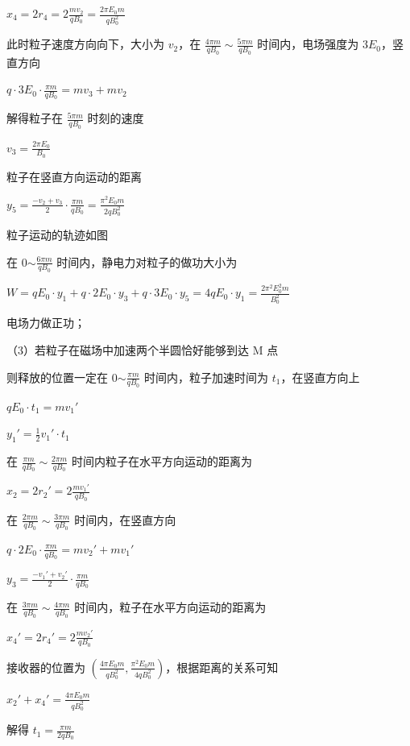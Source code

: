 \documentclass[\gkver]{gaokaozhenti}
\begin{document}
\begin{enumerate}
{$x_{4}=2r_{4}=2\frac{mv_{2}}{qB_{0}}=\frac{2\pi E_{0}m}{qB_{0}^{2}}$

此时粒子速度方向向下，大小为 $v_{2}$，在 $\frac{4\pi m}{qB_{0}}\sim\frac{5\pi m}{qB_{0}}$ 时间内，电场强度为 $3E_{0}$，竖直方向

$q\cdot 3E_{0}\cdot\frac{\pi m}{qB_{0}}=mv_{3}+mv_{2}$

解得粒子在 $\frac{5\pi m}{qB_{0}}$ 时刻的速度

$v_{3}=\frac{2\pi E_{0}}{B_{0}}$

粒子在竖直方向运动的距离

$y_{5}=\frac{-v_{2}+v_{3}}{2}\cdot\frac{\pi m}{qB_{0}}=\frac{\pi^{2}E_{0}m}{2qB_{0}^{2}}$

粒子运动的轨迹如图


在 0$\sim\frac{6\pi m}{qB_{0}}$ 时间内，静电力对粒子的做功大小为

$W=qE_{0}\cdot y_{1}+q\cdot 2E_{0}\cdot y_{3}+q\cdot 3E_{0}\cdot y_{5}=4qE_{0}\cdot y_{1}=\frac{2\pi^{2}E_{0}^{2}m}{B_{0}^{2}}$

电场力做正功；

（3）若粒子在磁场中加速两个半圆恰好能够到达 M 点

则释放的位置一定在 0$\sim\frac{\pi m}{qB_{0}}$ 时间内，粒子加速时间为 $t_{1}$，在竖直方向上

$qE_{0}\cdot t_{1}=mv_{1}'$

$y_{1}'=\frac{1}{2}v_{1}'\cdot t_{1}$

在 $\frac{\pi m}{qB_{0}}\sim\frac{2\pi m}{qB_{0}}$ 时间内粒子在水平方向运动的距离为

$x_{2}=2r_{2}'=2\frac{mv_{1}'}{qB_{0}}$

在 $\frac{2\pi m}{qB_{0}}\sim\frac{3\pi m}{qB_{0}}$ 时间内，在竖直方向

$q\cdot 2E_{0}\cdot\frac{\pi m}{qB_{0}}=mv_{2}'+mv_{1}'$

$y_{3}=\frac{-v_{1}'+v_{2}'}{2}\cdot\frac{\pi m}{qB_{0}}$

在 $\frac{3\pi m}{qB_{0}}\sim\frac{4\pi m}{qB_{0}}$ 时间内，粒子在水平方向运动的距离为

$x_{4}'=2r_{4}'=2\frac{mv_{2}'}{qB_{0}}$

接收器的位置为 $\left( \frac{4\pi E_{0}m}{qB_{0}^{2}},\frac{\pi^{2}E_{0}m}{4qB_{0}^{2}} \right)$，根据距离的关系可知

$x_{2}'+x_{4}'=\frac{4\pi E_{0}m}{qB_{0}^{2}}$

解得 $t_{1}=\frac{\pi m}{2qB_{0}}$

}
\end{enumerate}
\end{document}

